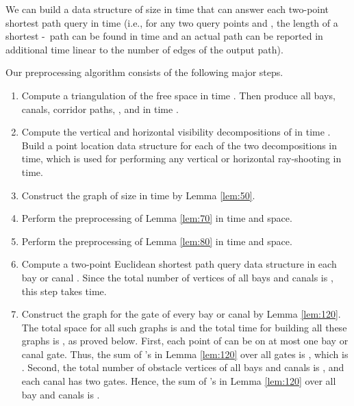 \documentclass[english,runningheads,11pt]{llncs}
\def\st{-}
\newenvironment{proof}{\noindent {\textbf{Proof:}}\rm}{\hfill \rm}
\begin{document}
\begin{theorem}\label{theo:20}
We can build a data structure of size  in  time that can
answer each two-point  shortest path query in  time (i.e., for
any two query points  and , the length of a shortest \st\ path can be found in 
time and an actual path can be reported in additional time linear to the number of edges of the output path).
\end{theorem}
\begin{proof}
Our preprocessing algorithm consists of the following major steps.

\begin{enumerate}
\item
Compute a triangulation of the free space  in
 time
\cite{ref:Bar-YehudaTr94,ref:ChazelleTr91}. Then produce
all bays, canals, corridor paths, , and  in
 time
\cite{ref:ChenA11ESA,ref:ChenCo12arXiv,ref:ChenL113STACS}.
\item
Compute the vertical and horizontal visibility decompositions of 
in  time \cite{ref:Bar-YehudaTr94,ref:ChazelleTr91}.
Build a point location data structure \cite{ref:EdelsbrunnerOp86,ref:KirkpatrickOp83}
for each of the two decompositions in  time, which is used for
performing any vertical or horizontal ray-shooting in 
time.
\item
Construct the graph  of size  in   time
by Lemma \ref{lem:50}.

\item
Perform the preprocessing of Lemma \ref{lem:70} in
 time and
 space.

\item
Perform the preprocessing of Lemma \ref{lem:80} in
 time and
 space.

\item
Compute a two-point Euclidean shortest path
query data structure  in each bay or canal . Since the
total number of vertices of all bays and canals is , this
step takes  time.

\item
Construct the graph  for the gate  of every bay or canal by Lemma
\ref{lem:120}. The total space for all such graphs is  and the total time for building all these graphs
is , as proved below.
First, each point of  can be on at most one
bay or canal gate. Thus, the sum of 's in Lemma \ref{lem:120} over all
gates  is , which is . Second, the total number
of obstacle vertices of all bays and canals  is , and each canal has two
gates. Hence, the sum of 's in Lemma \ref{lem:120} over all
bay and canals  is .



\end{enumerate}
\end{proof}
\end{document}
